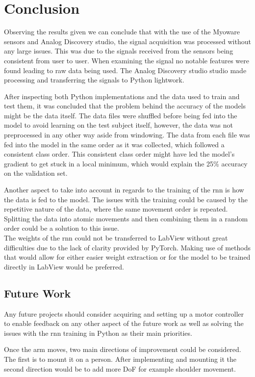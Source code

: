 \section{Conclusion}
Observing the results given we can conclude that with the use of the Myoware sensors and Analog Discovery studio, the signal 
acquisition was processed without any large issues. This was due to the signals received from the sensors being consistent 
from user to user. When examining the signal no notable features were found leading to raw data being used.
The Analog Discovery studio studio made processing and transferring the signals to Python lightwork.


After inspecting both Python implementations and the data used to train and test them, it was concluded that the problem behind the accuracy
of the models might be the data itself. The data files were shuffled before being fed into the model to avoid learning on the test subject
itself, however, the data was not preprocessed in any other way aside from windowing. The data from each file was fed into the model in the 
same order as it was collected, which followed a consistent class order. This consistent class order might have led the model's gradient to 
get stuck in a local minimum, which would explain the 25\% accuracy on the validation set.

Another aspect to take into account in regards to the training of the \acrshort{rnn} is how the data is fed to the model. The issues
with the training could be caused by the repetitive nature of the data, where the same movement order is repeated. Splitting the data
into atomic movements and then combining them in a random order could be a solution to this issue.
\\
The weights of the \acrshort{rnn} could not be transferred to LabView without great difficulties due to the lack of clarity provided by
PyTorch. Making use of methods that would allow for either easier weight extraction or for the model to be trained
directly in LabView would be preferred.



\subsection{Future Work}

Any future projects should consider acquiring and setting up a motor controller to enable feedback on any other aspect of the future work
as well as solving the issues with the \acrshort{rnn} training in Python as their main priorities.

Once the arm moves, two main directions of improvement could be considered. The first is to mount it on a person. After implementing and mounting it the second direction would be to
add more DoF for example shoulder movement.